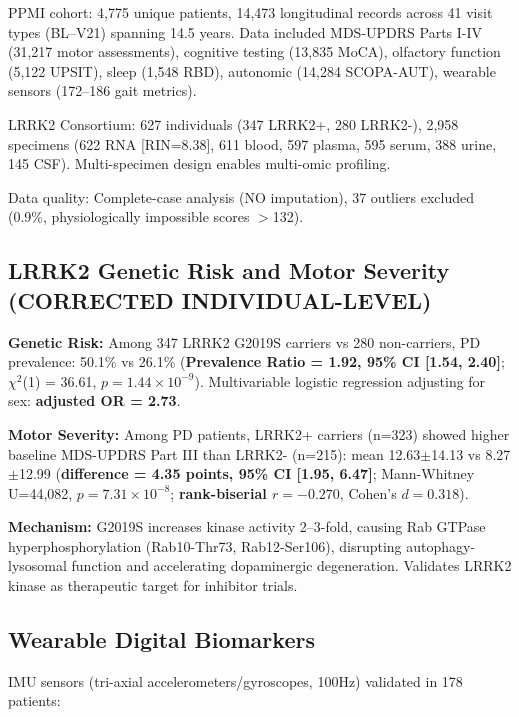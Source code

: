 \documentclass[11pt]{article}
\begin{document}
PPMI cohort: 4,775 unique patients, 14,473 longitudinal records across 41 visit types (BL--V21) spanning 14.5 years. Data included MDS-UPDRS Parts I-IV (31,217 motor assessments), cognitive testing (13,835 MoCA), olfactory function (5,122 UPSIT), sleep (1,548 RBD), autonomic (14,284 SCOPA-AUT), wearable sensors (172--186 gait metrics).

LRRK2 Consortium: 627 individuals (347 LRRK2+, 280 LRRK2-), 2,958 specimens (622 RNA [RIN=8.38], 611 blood, 597 plasma, 595 serum, 388 urine, 145 CSF). Multi-specimen design enables multi-omic profiling.

Data quality: Complete-case analysis (NO imputation), 37 outliers excluded (0.9\%, physiologically impossible scores $>$132).

\subsection{LRRK2 Genetic Risk and Motor Severity (CORRECTED INDIVIDUAL-LEVEL)}

\textbf{Genetic Risk:} Among 347 LRRK2 G2019S carriers vs 280 non-carriers, PD prevalence: 50.1\% vs 26.1\% (\textbf{Prevalence Ratio = 1.92, 95\% CI [1.54, 2.40]}; $\chi^2$(1) = 36.61, $p=1.44\times10^{-9}$). Multivariable logistic regression adjusting for sex: \textbf{adjusted OR = 2.73}.

\textbf{Motor Severity:} Among PD patients, LRRK2+ carriers (n=323) showed higher baseline MDS-UPDRS Part III\cite{goetz2008movement} than LRRK2- (n=215): mean 12.63$\pm$14.13 vs 8.27$\pm$12.99 (\textbf{difference = 4.35 points, 95\% CI [1.95, 6.47]}; Mann-Whitney U=44,082, $p=7.31\times10^{-8}$; \textbf{rank-biserial $r=-0.270$}, Cohen's $d=0.318$).

\textbf{Mechanism:} G2019S increases kinase activity 2--3-fold\cite{west2023lrrk2}, causing Rab GTPase hyperphosphorylation (Rab10-Thr73, Rab12-Ser106)\cite{steger2016phosphoproteomics,karayel2020accurate}, disrupting autophagy-lysosomal function and accelerating dopaminergic degeneration. Validates LRRK2 kinase as therapeutic target for inhibitor trials\cite{simuni2024lrrk2}.

\subsection{Wearable Digital Biomarkers}

IMU sensors (tri-axial accelerometers/gyroscopes, 100Hz)\cite{horak2015objective,mirelman2024wearable} validated in 178 patients:
\end{document}
